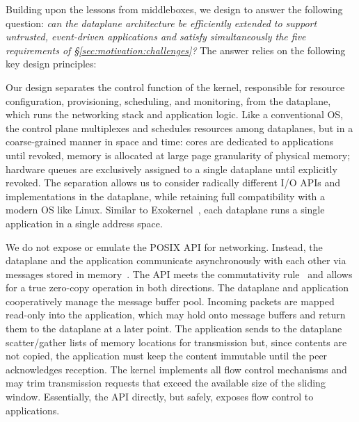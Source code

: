 
Building upon the lessons from middleboxes, we design \ix to answer
the following question: {\it {} can the dataplane architecture be
  efficiently extended to support untrusted, event-driven applications
  and satisfy simultaneously the five requirements of
  \S\ref{sec:motivation:challenges}?}  The answer relies on the
following key design principles:


Our design separates the control function of the kernel, responsible
for resource configuration, provisioning, scheduling, and monitoring,
from the dataplane, which runs the networking stack and application
logic.  Like a conventional OS, the control plane multiplexes and
schedules resources among dataplanes, but in a coarse-grained manner
in space and time: cores are dedicated to applications until revoked,
memory is allocated at large page granularity of physical memory;
hardware queues are exclusively assigned to a single dataplane until
explicitly revoked.  The separation allows us to consider radically
different I/O APIs and implementations in the dataplane, while
retaining full compatibility with a modern OS like Linux.  Similar to
Exokernel~\cite{DBLP:conf/sosp/EnglerKO95}, each dataplane runs a
single application in a single address space.


 We do
not expose or emulate the POSIX API for networking.  Instead, the
dataplane and the application communicate asynchronously with each
other via messages stored in
memory~\cite{rizzo2012netmap,han2012megapipe}.  The API meets the
commutativity rule~\cite{DBLP:conf/sosp/ClementsKZMK13} and allows for
a true zero-copy operation in both directions. The dataplane and
application cooperatively manage the message buffer pool. Incoming
packets are mapped read-only into the application, which may hold onto
message buffers and return them to the dataplane at a later point.
The application sends to the dataplane scatter/gather lists of memory
locations for transmission but, since contents are not copied, the
application must keep the content immutable until the peer
acknowledges reception. The kernel implements all flow control
mechanisms and may trim transmission requests that exceed the
available size of the sliding window.  Essentially, the API directly,
but safely, exposes flow control to applications.


